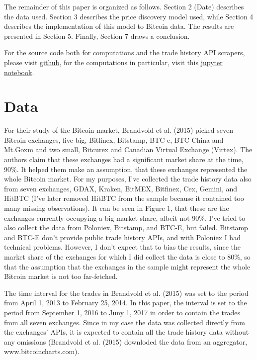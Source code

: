 \documentclass[a4paper,12pt]{article}
\begin{document}
    The remainder of this paper is organized as follows. Section 2 (Date) describes the data used. Section 3 describes the price discovery model used, while Section 4 describes the implementation of this model to Bitcoin data. The results are presented in Section 5. Finally, Section 7 draws a conclusion.

    For the source code both for computations and the trade history API scrapers, please visit \href{https://github.com/asdfkjahsdf/price_discovery}{github}, for the computations in particular, visit this \href{https://github.com/asdfkjahsdf/price_discovery/blob/master/notebook.ipynb}{jupyter notebook}.

  \section{Data}
    For their study of the Bitcoin market, Brandvold et al. (2015) picked seven Bitcoin exchanges, five big, Bitfinex, Bitstamp, BTC-e, BTC China and Mt.Goxm and two small, Bitcurex and Canadian Virtual Exchange (Virtex). The authors claim that these exchanges had a significant market share at the time, 90\%. It helped them make an assumption, that these exchanges represented the whole Bitcoin market. For my purposes, I've collected the trade history data also from seven exchanges, GDAX, Kraken, BitMEX, Bitfinex, Cex, Gemini, and HitBTC (I've later removed HitBTC from the sample because it contained too many missing observations). It can be seen in Figure 1, that these are the exchanges currently occupying a big market share, albeit not 90\%. I've tried to also collect the data from Poloniex, Bitstamp, and BTC-E, but failed. Bitstamp and BTC-E don't provide public trade history APIs, and with Poloniex I had technical problems. However, I don't expect that to bias the results, since the market share of the exchanges for which I did collect the data is close to 80\%, so that the assumption that the exchanges in the sample might represent the whole Bitcoin market is not too far-fetched.

    The time interval for the trades in Brandvold et al. (2015) was set to the period from April 1, 2013 to February 25, 2014. In this paper, the interval is set to the period from September 1, 2016 to Juny 1, 2017 in order to contain the trades from all seven exchanges. Since in my case the data was collected directly from the exchanges' APIs, it is expected to contain all the trade history data without any omissions (Brandvold et al. (2015) downloded the data from an aggregator, www.bitcoincharts.com).
\end{document}
